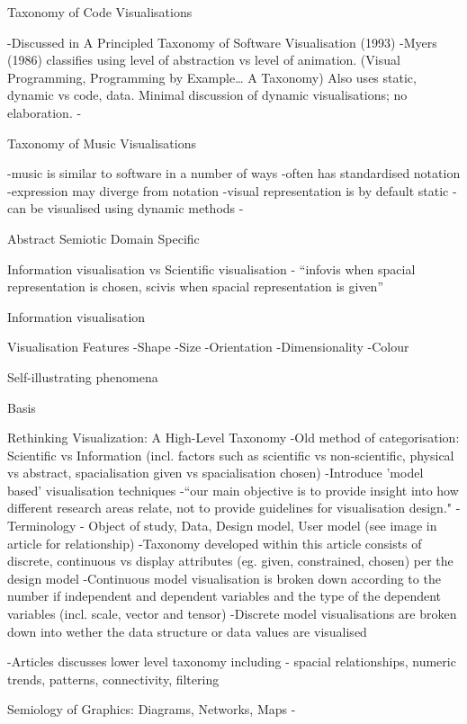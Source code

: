 Taxonomy of Code Visualisations

-Discussed in A Principled Taxonomy of Software Visualisation (1993)
-Myers (1986) classifies using level of abstraction vs level of animation. (Visual Programming, Programming by Example… A Taxonomy) Also uses {static, dynamic} vs {code, data}. Minimal discussion of dynamic visualisations; no elaboration.
-


Taxonomy of Music Visualisations

-music is similar to software in a number of ways
	-often has standardised notation
	-expression may diverge from notation
	-visual representation is by default static
	-can be visualised using dynamic methods
	-





Abstract
Semiotic
Domain Specific




Information visualisation vs Scientific visualisation - “infovis when spacial representation is chosen, scivis when spacial representation is given”




Information visualisation



Visualisation Features
-Shape
-Size
-Orientation
-Dimensionality
-Colour


Self-illustrating phenomena



Basis

Rethinking Visualization: A High-Level Taxonomy
-Old method of categorisation: Scientific vs Information (incl. factors such as scientific vs non-scientific, physical vs abstract, spacialisation given vs spacialisation chosen)
-Introduce 'model based' visualisation techniques
-“our main objective is to provide insight into how different research areas relate, not to provide guidelines for visualisation design."
-Terminology - Object of study, Data, Design model, User model (see image in article for relationship)
-Taxonomy developed within this article consists of {discrete, continuous} vs display attributes (eg. given, constrained, chosen) per the design model
-Continuous model visualisation is broken down according to the number if independent and dependent variables and the type of the dependent variables (incl. scale, vector and tensor)
-Discrete model visualisations are broken down into wether the data structure or data values are visualised

-Articles discusses lower level taxonomy including - spacial relationships, numeric trends, patterns, connectivity, filtering


Semiology of Graphics: Diagrams, Networks, Maps
-


